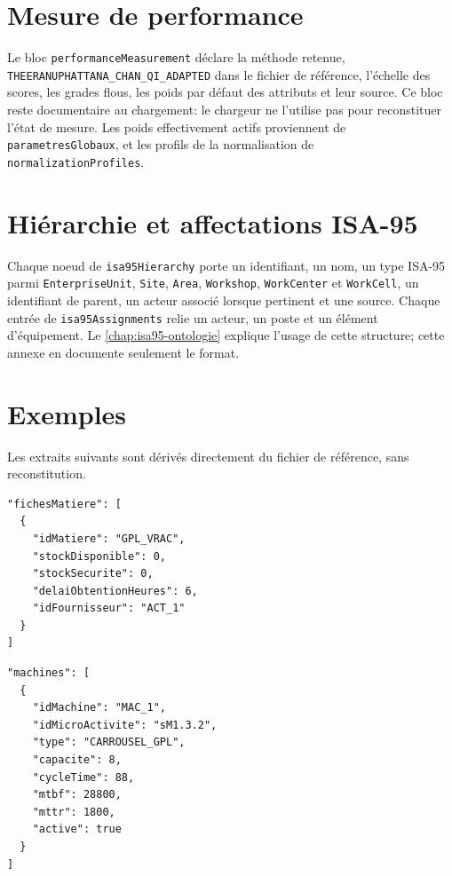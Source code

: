 \section{Mesure de performance}

Le bloc \texttt{performance\allowbreak Measurement} déclare la méthode retenue, \texttt{THEERANUPHATTANA\_\allowbreak CHAN\_QI\_\allowbreak ADAPTED} dans le fichier de référence, l'échelle des scores, les grades flous, les poids par défaut des attributs et leur source. Ce bloc reste documentaire au chargement: le chargeur ne l'utilise pas pour reconstituer l'état de mesure. Les poids effectivement actifs proviennent de \texttt{parametres\allowbreak Globaux}, et les profils de la normalisation de \texttt{normalization\allowbreak Profiles}.

\section{Hiérarchie et affectations ISA-95}

Chaque noeud de \texttt{isa95Hierarchy} porte un identifiant, un nom, un type ISA-95 parmi \texttt{EnterpriseUnit}, \texttt{Site}, \texttt{Area}, \texttt{Workshop}, \texttt{WorkCenter} et \texttt{WorkCell}, un identifiant de parent, un acteur associé lorsque pertinent et une source. Chaque entrée de \texttt{isa95Assignments} relie un acteur, un poste et un élément d'équipement. Le \cref{chap:isa95-ontologie} explique l'usage de cette structure; cette annexe en documente seulement le format.

\section{Exemples}

Les extraits suivants sont dérivés directement du fichier de référence, sans reconstitution.

\begin{verbatim}
"fichesMatiere": [
  {
    "idMatiere": "GPL_VRAC",
    "stockDisponible": 0,
    "stockSecurite": 0,
    "delaiObtentionHeures": 6,
    "idFournisseur": "ACT_1"
  }
]
\end{verbatim}

\begin{verbatim}
"machines": [
  {
    "idMachine": "MAC_1",
    "idMicroActivite": "sM1.3.2",
    "type": "CARROUSEL_GPL",
    "capacite": 8,
    "cycleTime": 88,
    "mtbf": 28800,
    "mttr": 1800,
    "active": true
  }
]
\end{verbatim}

